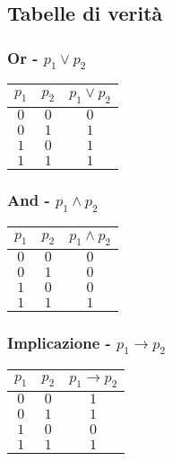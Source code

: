 \documentclass[a4paper,12pt]{report}
\begin{document}
\subsection{Tabelle di verit\`{a}}
\begin{multicols}{3}
\subsubsection{Or - $p_1\lor p_2$} 
\begin{tabular}{c c | c}
$p_1$ & $p_2$ & $p_1 \lor p_2$ \\
\hline
$0$ & $0$ & $0$ \\
$0$ & $1$ & $1$ \\
$1$ & $0$ & $1$ \\
$1$ & $1$ & $1$ 
\end{tabular}

\subsubsection{And - $p_1\wedge p_2$} 
\begin{tabular}{c c | c}
$p_1$ & $p_2$ & $p_1 \wedge p_2$ \\
\hline
$0$ & $0$ & $0$ \\
$0$ & $1$ & $0$ \\
$1$ & $0$ & $0$ \\
$1$ & $1$ & $1$ 
\end{tabular}
\subsubsection{Implicazione - $p_1\to p_2$} 
\begin{tabular}{c c | c}
$p_1$ & $p_2$ & $p_1 \to p_2$ \\
\hline
$0$ & $0$ & $1$ \\
$0$ & $1$ & $1$ \\
$1$ & $0$ & $0$ \\
$1$ & $1$ & $1$ 
\end{tabular}
\end{multicols}
\end{document}

